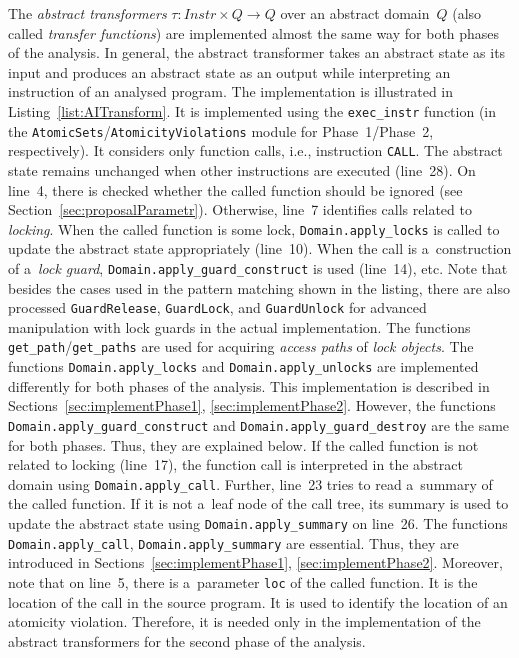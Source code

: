 The \emph{abstract transformers} $ \tau : Instr \times Q \rightarrow Q $ over an abstract domain~$ Q $ (also called \emph{transfer functions}) are implemented almost the same way for both phases of the analysis. In general, the abstract transformer takes an abstract state as its input and produces an abstract state as an output while interpreting an instruction of an analysed program. The implementation is illustrated in Listing~\ref{list:AITransform}. It is implemented using the \texttt{exec\_instr} function (in the \texttt{AtomicSets}/\texttt{AtomicityViolations} module for Phase~1/Phase~2, respectively). It considers only function calls, i.e., instruction \texttt{CALL}. The abstract state remains unchanged when other instructions are executed (line~28). On line~4, there is checked whether the called function should be ignored (see Section~\ref{sec:proposalParametr}). Otherwise, line~7 identifies calls related to \emph{locking}. When the called function is some lock, \texttt{Domain.apply\_locks} is called to update the abstract state appropriately (line~10). When the call is a~construction of a~\emph{lock guard}, \texttt{Domain.apply\_guard\_construct} is used (line~14), etc. Note that besides the cases used in the pattern matching shown in the listing, there are also processed \texttt{GuardRelease}, \texttt{GuardLock}, and \texttt{GuardUnlock} for advanced manipulation with lock guards in the actual implementation. The functions \texttt{get\_path}/\texttt{get\_paths} are used for acquiring \emph{access paths} of \emph{lock objects}. The functions \texttt{Domain.apply\_locks} and \texttt{Domain.apply\_unlocks} are implemented differently for both phases of the analysis. This implementation is described in Sections~\ref{sec:implementPhase1}, \ref{sec:implementPhase2}. However, the functions \texttt{Domain.apply\_guard\_construct} and \texttt{Domain.apply\_guard\_destroy} are the same for both phases. Thus, they are explained below. If the called function is not related to locking (line~17), the function call is interpreted in the abstract domain using \texttt{Domain.apply\_call}. Further, line~23 tries to read a~summary of the called function. If it is not a~leaf node of the call tree, its summary is used to update the abstract state using \texttt{Domain.apply\_summary} on line~26. The functions  \texttt{Domain.apply\_call}, \texttt{Domain.apply\_summary} are essential. Thus, they are introduced in Sections~\ref{sec:implementPhase1}, \ref{sec:implementPhase2}. Moreover, note that on line~5, there is a~parameter \texttt{loc} of the called function. It is the location of the call in the source program. It is used to identify the location of an atomicity violation. Therefore, it is needed only in the implementation of the abstract transformers for the second phase of the analysis.

